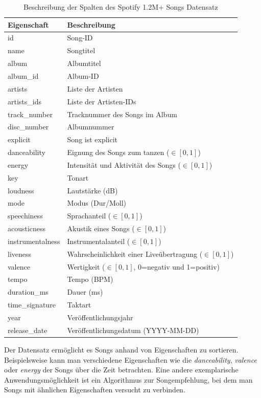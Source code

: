 \documentclass[conference]{IEEEtran}
\begin{document}
\begin{table}[h]
    \caption{Beschreibung der Spalten des Spotify 1.2M+ Songs Datensatz}
    \begin{center}  
    \begin{tabular}{ll}
        Eigenschaft & Beschreibung \\ \hline
        id & Song-ID \\
        name & Songtitel \\
        album & Albumtitel \\
        album\_id &  Album-ID\\
        artists & Liste der Artisten \\
        artists\_ids & Liste der Artisten-IDs \\
        track\_number & Tracknummer des Songs im Album \\
        disc\_number & Albumnummer \\
        explicit & Song ist explicit\\
        danceability & Eignung des Songs zum tanzen ($\in [0,1]$) \\
        energy & Intensität und Aktivität des Songs ($\in [0,1]$) \\
        key & Tonart \\
        loudness & Lautstärke (dB) \\
        mode & Modus (Dur/Moll) \\
        speechiness & Sprachanteil ($\in [0,1]$) \\
        acousticness & Akustik eines Songs ($\in [0,1]$) \\
        instrumentalness & Instrumentalanteil ($\in [0,1]$) \\
        liveness & Wahrscheinlichkeit einer Liveübertragung ($\in [0,1]$) \\
        valence & Wertigkeit ($\in [0,1]$, 0=negativ und 1=positiv) \\
        tempo & Tempo (BPM) \\
        duration\_ms & Dauer (ms) \\
        time\_signature & Taktart \\
        year & Veröffentlichungsjahr \\
        release\_date & Veröffentlichungsdatum (YYYY-MM-DD)
    \end{tabular}
    \end{center}
    \label{tab:song_feat}
\end{table}

Der Datensatz ermöglicht es Songs anhand von Eigenschaften zu sortieren. Beispielsweise kann man verschiedene Eigenschaften wie die \textit{danceability}, \textit{valence} oder \textit{energy} der Songs über die Zeit betrachten. Eine andere exemplarische Anwendungsmöglichkeit ist ein Algorithmus zur Songempfehlung, bei dem man Songs mit ähnlichen Eigenschaften versucht zu verbinden. 
\end{document}
